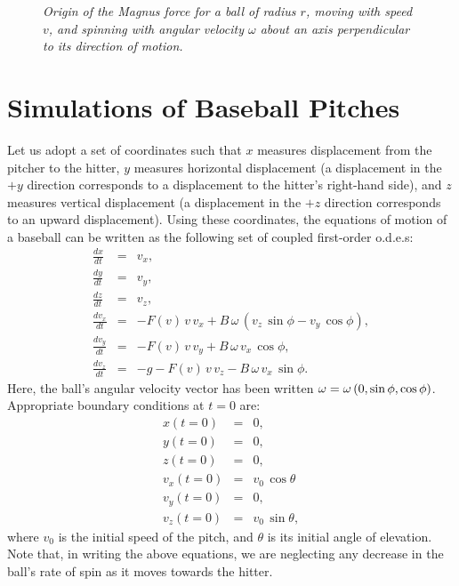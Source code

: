 \begin{figure}
\epsfysize=2.75in
\centerline{}
\caption{\em Origin of the Magnus force for a ball of radius $r$, moving with
speed $v$, and spinning with angular velocity $\omega$ about an axis
perpendicular to its direction of motion. }\label{fmagnus}
\end{figure}

\section{Simulations of Baseball Pitches}
Let us adopt a set of coordinates such that $x$ measures displacement from
the pitcher to the hitter, $y$ measures horizontal displacement (a displacement
in the $+y$ direction corresponds to a displacement to the hitter's right-hand
side), and $z$ measures vertical displacement (a displacement
in the $+z$ direction corresponds to an upward displacement). Using these
coordinates, the equations of motion of a baseball can be written as the
following set of coupled first-order o.d.e.s:
\begin{eqnarray}
\frac{dx}{dt} &=& v_x,\\[0.5ex]
\frac{dy}{dt} &=& v_y,\\[0.5ex]
\frac{dz}{dt} &=& v_z,\\[0.5ex]
\frac{dv_x}{dt} &=& - F(v)\,v\,v_x + B\,\omega\,(v_z\,\sin\phi-v_y\,\cos\phi),\\[0.5ex]
\frac{dv_y}{dt} &=& - F(v)\,v\,v_y + B\,\omega\,v_x\,\cos\phi,\\[0.5ex]
\frac{dv_z}{dt} &=& -g - F(v)\,v\,v_z - B\,\omega\,v_x\,\sin\phi.
\end{eqnarray}
Here,  the ball's angular velocity vector has been written
${\bf \omega} = \omega\,(0,\sin\phi,\cos\phi)$. 
Appropriate boundary conditions at $t=0$ are:
\begin{eqnarray}
x(t=0) &=& 0,\\[0.5ex]
y(t=0) &=& 0,\\[0.5ex]
z(t=0) &=& 0,\\[0.5ex]
v_x(t=0) &=& v_0\,\cos\theta\\[0.5ex]
v_y(t=0) &=& 0,\\[0.5ex]
v_z(t=0) &=& v_0\,\sin\theta,
\end{eqnarray}
where $v_0$ is the initial speed of the pitch, and $\theta$ is its initial
angle of elevation. Note that, in writing the above equations, we are
neglecting any decrease in the ball's rate of spin as it moves towards the hitter.

